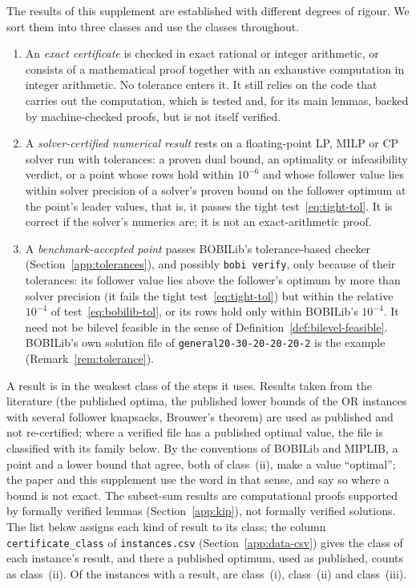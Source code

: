 The results of this supplement are established with different degrees of
rigour. We sort them into three classes and use the classes throughout.

\begin{definition}\label{def:classes}
\leavevmode
\begin{enumerate}
\item[(i)] An \emph{exact certificate} is checked in exact rational or
integer arithmetic, or consists of a mathematical proof together with an
exhaustive computation in integer arithmetic. No tolerance enters it. It
still relies on the code that carries out the computation, which is tested
and, for its main lemmas, backed by machine-checked proofs, but is not itself
verified.
\item[(ii)] A \emph{solver-certified numerical result} rests on a
floating-point LP, MILP or CP solver run with tolerances: a proven dual bound,
an optimality or infeasibility verdict, or a point whose rows hold within
$10^{-6}$ and whose follower value lies within solver precision of a solver's
proven bound on the follower optimum at the point's leader values, that is,
it passes the tight test~\eqref{eq:tight-tol}. It is correct if the solver's
numerics are; it is not an exact-arithmetic proof.
\item[(iii)] A \emph{benchmark-accepted point} passes BOBILib's
tolerance-based checker (Section~\ref{app:tolerances}), and possibly
\texttt{bobi verify}, only because of their tolerances: its follower value
lies above the follower's optimum by more than solver precision (it fails the
tight test~\eqref{eq:tight-tol}) but within the relative $10^{-4}$ of
test~\eqref{eq:bobilib-tol}, or its rows hold only within BOBILib's $10^{-4}$.
It need not be bilevel feasible in the sense of
Definition~\ref{def:bilevel-feasible}. BOBILib's own solution file of
\texttt{general20-30-20-20-20-2} is the example (Remark~\ref{rem:tolerance}).
\end{enumerate}
\end{definition}

A result is in the weakest class of the steps it uses. Results taken from
the literature (the published optima, the published lower bounds of the OR
instances with several follower knapsacks, Brouwer's theorem) are used as
published and not re-certified; where a verified file has a published
optimal value, the file is classified with its family below. By the
conventions of BOBILib and MIPLIB, a point and a lower bound that agree,
both of class~(ii), make a value ``optimal''; the paper and this supplement
use the word in that sense, and say so where a bound is not exact. The
subset-sum results are computational proofs supported by formally verified
lemmas (Section~\ref{app:kip}), not formally verified solutions. The list
below assigns each kind of result to its class; the column
\texttt{certificate\_class} of \texttt{instances.csv} (Section~\ref{app:data-csv})
gives the class of each instance's result, and there a published optimum,
used as published, counts as class~(ii). Of the \NumClassRows{} instances with a
result, \NumClassExact{} are class~(i), \NumClassNumerical{} class~(ii) and
\NumClassBenchmark{} class~(iii).

